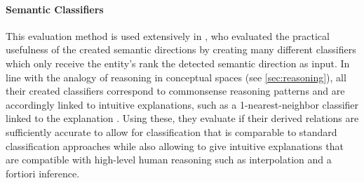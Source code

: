 \paragraph{Semantic Classifiers} This evaluation method is used extensively in \cite{Derrac2015}, who evaluated the practical usefulness of the created semantic directions by creating many different classifiers which only receive the entity's \gls{rank} \wrt the detected semantic direction as input. In line with the analogy of reasoning in conceptual spaces (see \ref{sec:reasoning}), all their created classifiers correspond to commonsense reasoning patterns and are accordingly linked to intuitive explanations, such as a 1-nearest-neighbor classifier linked to the explanation \textit{}. Using these, they evaluate if their derived relations are sufficiently accurate to allow for classification that is comparable to standard classification approaches while also allowing to give intuitive explanations that are compatible with high-level human reasoning such as interpolation and a fortiori inference.

